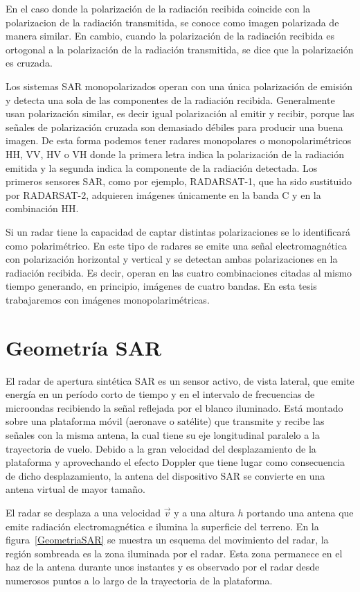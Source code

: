 En el caso donde la polarización de la radiación recibida coincide con la polarizacion de la radiación transmitida, se conoce como imagen polarizada de manera similar. En cambio, cuando la polarización de la radiación recibida es ortogonal a la polarización de la radiación transmitida, se dice que la polarización es cruzada.  

Los sistemas SAR monopolarizados operan con una única polarización de emisión y detecta una sola de las componentes de la radiación recibida. Generalmente usan polarización similar, es decir igual polarización al emitir y recibir,  porque las señales de polarización cruzada son demasiado débiles para producir una buena imagen. De esta forma podemos tener radares monopolares o monopolarimétricos HH, VV, HV o VH donde la primera letra indica la polarización de la radiación emitida y la segunda indica la componente de la radiación detectada. Los primeros sensores SAR, como por ejemplo,  RADARSAT-1, que ha sido sustituido por RADARSAT-2, adquieren imágenes únicamente en la banda C y en la combinación HH. 

Si un radar tiene la capacidad de captar distintas polarizaciones se lo identificará como polarimétrico. En este tipo de radares se emite una señal electromagnética con polarización horizontal y vertical y se detectan ambas polarizaciones en la radiación recibida. Es decir, operan en las cuatro combinaciones citadas al mismo tiempo generando, en principio, imágenes de cuatro bandas. En esta tesis trabajaremos con imágenes monopolarimétricas.

\section{Geometría SAR}

El radar de apertura sintética SAR  es un sensor activo, de vista lateral, que emite energía en un período corto de tiempo y en el  intervalo  de  frecuencias  de  microondas recibiendo la señal reflejada por el blanco iluminado. Está montado sobre una plataforma móvil (aeronave o satélite) que transmite y recibe las señales con la misma antena, la cual tiene su eje longitudinal paralelo a la trayectoria de vuelo. Debido a la gran velocidad del desplazamiento de la plataforma y aprovechando el efecto Doppler que tiene lugar como consecuencia de dicho desplazamiento, la antena del dispositivo SAR  se convierte en una antena virtual de mayor tamaño. 

El radar se desplaza a una velocidad $\vec{v}$ y a una altura $h$ portando una antena que emite radiación electromagnética e ilumina la superficie del terreno. En la figura~\ref{GeometriaSAR} se muestra un esquema del movimiento del radar, la región sombreada es la zona iluminada por el radar. Esta zona permanece en el haz de la antena durante unos instantes y es observado por el radar desde numerosos puntos a lo largo de la trayectoria de la plataforma.

